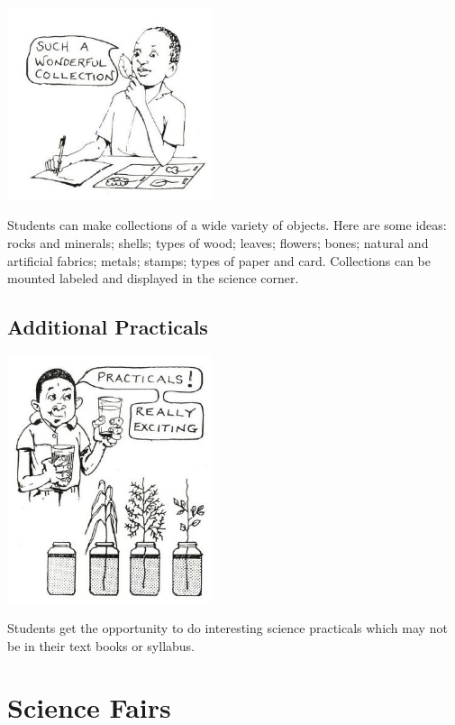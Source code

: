\begin{multicols}{2}
\begin{center}
\includegraphics[width=0.45\textwidth]{./img/source/collections-research.jpg}
\end{center}

Students can make collections of a wide
variety of objects. Here are some ideas: rocks
and minerals; shells; types of wood; leaves;
flowers; bones; natural and artificial fabrics;
metals; stamps; types of paper and card.
Collections can be mounted labeled and
displayed in the science corner.

\subsection{Additional Practicals}

\begin{center}
\includegraphics[width=0.45\textwidth]{./img/source/extra-practicals.jpg}
\end{center}

Students get the opportunity to do interesting
science practicals which may not be in their text
books or syllabus.


\section{Science Fairs}


\end{multicols}
